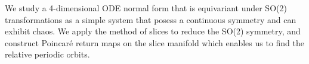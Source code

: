 \color{black}
We study a 4-dimensional ODE normal form that is equivariant under SO(2)
transformations as a simple system that posess a continuous symmetry and
can exhibit chaos. We apply the method of slices to reduce the SO(2) symmetry,
and construct Poincar\'e return maps on the slice manifold which enables 
us to find the relative periodic orbits.   
